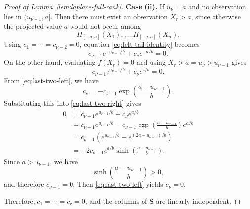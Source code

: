 \documentclass[10pt,a4paper]{amsart}
\begin{document}
\begin{proof}[Proof of Lemma~\ref{lem:laplace-full-rank}]
\textbf{Case (ii).} If $u_\nu=a$ and no observation lies in $(u_{\nu-1},a]$. Then there must exist an observation $X_r>a$, since otherwise the projected value $a$ would not occur among
\begin{equation*}
\Pi_{[-a,a]}(X_1),\dots,\Pi_{[-a,a]}(X_n).
\end{equation*}
Using $c_1=\cdots=c_{\nu-2}=0$, equation \eqref{eq:left-tail-identity} becomes
\begin{equation}\label{eq:last-two-left}
c_{\nu-1}e^{-u_{\nu-1}/b}+c_\nu e^{-a/b}=0.
\end{equation}
On the other hand, evaluating $f(X_r)=0$ and using $X_r>a=u_\nu>u_{\nu-1}$ gives
\begin{equation}\label{eq:last-two-right}
c_{\nu-1}e^{u_{\nu-1}/b}+c_\nu e^{a/b}=0.
\end{equation}
From \eqref{eq:last-two-left}, we have
\begin{equation*}
c_\nu=-c_{\nu-1}\exp\left(\frac{a-u_{\nu-1}}{b}\right).
\end{equation*}
Substituting this into \eqref{eq:last-two-right} gives
\begin{align*}
0&=c_{\nu-1}e^{u_{\nu-1}/b}+c_\nu e^{a/b} \\
&=c_{\nu-1}e^{u_{\nu-1}/b}-c_{\nu-1}\exp\left(\frac{a-u_{\nu-1}}{b}\right)e^{a/b} \\
&=c_{\nu-1}\left(e^{u_{\nu-1}/b}-e^{(2a-u_{\nu-1})/b}\right) \\
&=-2c_{\nu-1}e^{a/b}\sinh\left(\frac{a-u_{\nu-1}}{b}\right).
\end{align*}
Since $a>u_{\nu-1}$, we have
\begin{equation*}
\sinh\left(\frac{a-u_{\nu-1}}{b}\right)>0,
\end{equation*}
and therefore $c_{\nu-1}=0$. Then \eqref{eq:last-two-left} yields $c_\nu=0$.

Therefore, $c_1=\cdots=c_\nu=0$, and the columns of $\mathbf S$ are linearly independent.
\end{proof}
\end{document}
